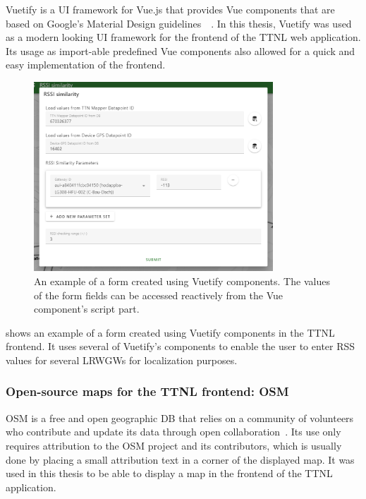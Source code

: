 Vuetify is a \ac{UI} framework for Vue.js that provides Vue components that are based on Google's Material Design guidelines~\cite{vuetify_vuetify_2023}~\cite{google_llc_material_nodate}.
In this thesis, Vuetify was used as a modern looking \ac{UI} framework for the frontend of the \ac{TTNL} web application.
Its usage as import-able predefined Vue components also allowed for a quick and easy implementation of the frontend.

\begin{figure}[htbp]
    \centering
    \includegraphics[width=0.8\textwidth]{pictures/ttn-locator/frontend/vuetify-form-example.png}
    \caption{
        An example of a form created using Vuetify components.
        The values of the form fields can be accessed reactively from the Vue component's script part.
    }\label{fig:vuetify-form-example}
\end{figure}

 shows an example of a form created using Vuetify components in the \ac{TTNL} frontend.
It uses several of Vuetify's components to enable the user to enter \ac{RSS} values for several \aclp{LRWGW} for localization purposes.

\subsubsection{Open-source maps for the \acl{TTNL} frontend: \acf{OSM}}\label{sec:osm}

\ac{OSM} is a free and open geographic \ac{DB} that relies on a community of volunteers who contribute and update its data through open collaboration~\cite{openstreetmap_contributors_openstreetmap_2023}.
Its use only requires attribution to the \ac{OSM} project and its contributors, which is usually done by placing a small attribution text in a corner of the displayed map.
It was used in this thesis to be able to display a map in the frontend of the \ac{TTNL} application.

